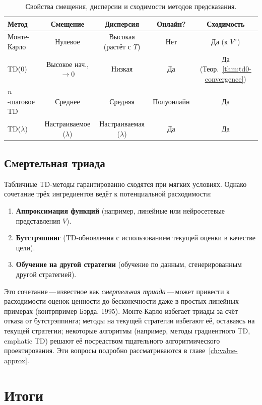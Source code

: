 \begin{table}[ht]
\centering
\caption{Свойства смещения, дисперсии и сходимости методов предсказания.}
\label{tab:bias-variance-comparison}
\begin{tabular}{lcccc}
\toprule
\textbf{Метод} & \textbf{Смещение} & \textbf{Дисперсия} & \textbf{Онлайн?} & \textbf{Сходимость}\\
\midrule
Монте-Карло & Нулевое & Высокая (растёт с $T$) & Нет & Да (к $V^\pi$)\\
TD(0) & Высокое нач., $\to 0$ & Низкая & Да & Да (Теор.~\ref{thm:td0-convergence})\\
$n$-шаговое TD & Среднее & Средняя & Полуонлайн & Да\\
TD($\lambda$) & Настраиваемое ($\lambda$) & Настраиваемая ($\lambda$) & Да & Да\\
\bottomrule
\end{tabular}
\end{table}

\subsection{Смертельная триада}

Табличные TD-методы гарантированно сходятся при мягких условиях.  Однако сочетание трёх ингредиентов ведёт к потенциальной расходимости:
\begin{enumerate}
  \item \textbf{Аппроксимация функций} (например, линейные или нейросетевые представления $V$).
  \item \textbf{Бутстрэппинг} (TD-обновления с использованием текущей оценки в качестве цели).
  \item \textbf{Обучение на другой стратегии} (обучение по данным, сгенерированным другой стратегией).
\end{enumerate}
Это сочетание\,---\,известное как \emph{смертельная триада}\,---\,может привести к расходимости оценок ценности до бесконечности даже в простых линейных примерах (контрпример Бэрда, 1995).  Монте-Карло избегает триады за счёт отказа от бутстрэппинга; методы на текущей стратегии избегают её, оставаясь на текущей стратегии; некоторые алгоритмы (например, методы градиентного TD, emphatic TD) решают её посредством тщательного алгоритмического проектирования.  Эти вопросы подробно рассматриваются в главе~\ref{ch:value-approx}.

\section{Итоги}
\label{sec:td-summary}

